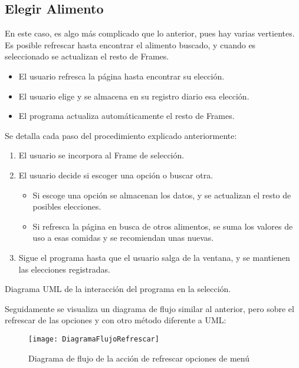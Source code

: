 \subsection{Elegir Alimento}
En este caso, es algo más complicado que lo anterior, pues hay varias vertientes. Es posible refrescar hasta encontrar el alimento buscado, y cuando es seleccionado se actualizan el resto de Frames.
\begin{itemize}
\item El usuario refresca la página hasta encontrar su elección. 
\item El usuario elige y se almacena en su registro diario esa elección.
\item El programa actualiza automáticamente el resto de Frames.
\end{itemize}
Se detalla cada paso del procedimiento explicado anteriormente:
\begin{enumerate}
\item El usuario se incorpora al Frame de selección.
\item El usuario decide si escoger una opción o buscar otra.
\begin{itemize}
\item Si escoge una opción se almacenan los datos, y se actualizan el resto de posibles elecciones.
\item Si refresca la página en busca de otros alimentos, se suma los valores de uso a esas comidas y se recomiendan unas nuevas.
\end{itemize}
\item Sigue el programa hasta que el usuario salga de la ventana, y se mantienen las elecciones registradas.
\end{enumerate}
Diagrama UML de la interacción del programa en la selección. \\
\pagebreak

Seguidamente se visualiza un diagrama de flujo  similar al anterior, pero sobre el refrescar de las opciones y con otro método diferente a UML:
\begin{figure}[h]
\centering
\texttt{[image: DiagramaFlujoRefrescar]}
\caption{Diagrama de flujo de la acción de refrescar opciones de menú}
\label{figura:refrescar}
\end{figure}
\pagebreak
